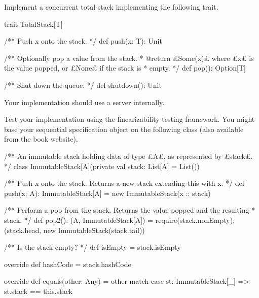 \begin{questionS}
Implement a concurrent total stack implementing the following trait.
%
\begin{scala}
trait TotalStack[T]{
  /** Push x onto the stack. */
  def push(x: T): Unit

  /** Optionally pop a value from the stack.
    * @return £Some(x)£ where £x£ is the value popped, or £None£ if the stack is
    * empty. */
  def pop(): Option[T]

  /** Shut down the queue. */
  def shutdown(): Unit
}
\end{scala}
% 
% 
Your implementation should use a server internally.

Test your implementation using the linearizability testing framework.  You
might base your sequential specification object on the following class (also
available from the book website).
%
\begin{scala}
/** An immutable stack holding data of type £A£, as represented by £stack£. */
class ImmutableStack[A](private val stack: List[A] = List()){
  /** Push x onto the stack.  Returns a new stack extending this with x. */
  def push(x: A): ImmutableStack[A] = new ImmutableStack(x :: stack)

  /** Perform a pop from the stack.  Returns the value popped and the resulting
    * stack. */
  def pop2(): (A, ImmutableStack[A]) = {
    require(stack.nonEmpty); (stack.head, new ImmutableStack(stack.tail))
  }

  /** Is the stack empty? */
  def isEmpty = stack.isEmpty

  override def hashCode = stack.hashCode

  override def equals(other: Any) = other match{
    case st: ImmutableStack[_] => st.stack == this.stack
  }
}
\end{scala}
\end{questionS}


